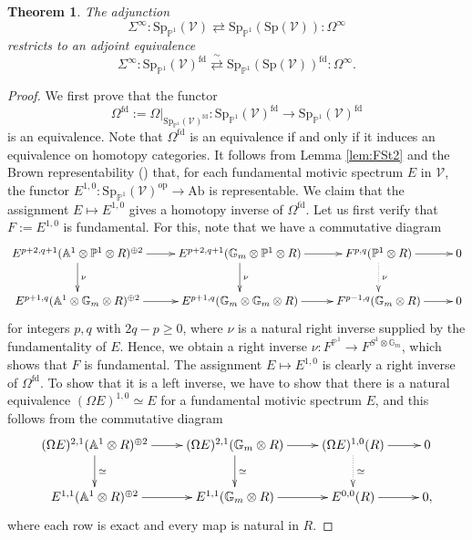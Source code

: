 \documentclass{amsart}
\theoremstyle{plain}
\newtheorem{theorem}{Theorem}[subsection]
\theoremstyle{definition}
\theoremstyle{remark}
\numberwithin{equation}{theorem}
\newcommand{\mbb}[1]{\mathbb{#1}}
\newcommand{\Ab}{\mathrm{Ab}}
\newcommand{\Sp}{\mathrm{Sp}}
\newcommand{\V}{\mathcal{V}}
\newcommand{\fd}{\mathrm{fd}}
\newcommand{\op}{\mathrm{op}}
\newcommand{\SpP}{\mathrm{Sp}_{\mathbb{P}^1}}
\begin{document}
\begin{theorem}\label{thm:FSt}
The adjunction
\[
	\Sigma^\infty \colon \SpP(\V) \rightleftarrows \SpP(\Sp(\V)) \colon \Omega^\infty
\]
restricts to an adjoint equivalence
\[
	\Sigma^\infty \colon \SpP(\V)^\fd \overset{\sim}{\rightleftarrows} \SpP(\Sp(\V))^\fd \colon \Omega^\infty.
\]
\end{theorem}
\begin{proof}
We first prove that the functor
\[
	\Omega^\fd:=\Omega\vert_{\SpP(\V)^\fd} \colon \SpP(\V)^\fd \to \SpP(\V)^\fd
\]
is an equivalence.
Note that $\Omega^\fd$ is an equivalence if and only if it induces an equivalence on homotopy categories.
It follows from Lemma \ref{lem:FSt2} and the Brown representability (\cite[1.4.1.10]{HA}) that, for each fundamental motivic spectrum $E$ in $\V$, the functor $E^{1,0}\colon\SpP(\V)^\op\to\Ab$ is representable.
We claim that the assignment $E\mapsto E^{1,0}$ gives a homotopy inverse of $\Omega^\fd$.
Let us first verify that $F:=E^{1,0}$ is fundamental.
For this, note that we have a commutative diagram
\[
\xymatrix{
	E^{p+2,q+1}(\mbb{A}^1\otimes\mbb{P}^1\otimes R)^{\oplus 2} \ar[r] \ar[d]^\nu &
		E^{p+2,q+1}(\mbb{G}_m\otimes\mbb{P}^1\otimes R) \ar[r] \ar[d]^\nu & F^{p,q}(\mbb{P}^1\otimes R) \ar[r] \ar@{.>}[d]^\nu & 0 \\
	E^{p+1,q}(\mbb{A}^1\otimes\mbb{G}_m\otimes R)^{\oplus 2} \ar[r] &
		E^{p+1,q}(\mbb{G}_m\otimes\mbb{G}_m\otimes R) \ar[r] & F^{p-1,q}(\mbb{G}_m\otimes R) \ar[r] & 0
}
\]
for integers $p,q$ with $2q-p\ge 0$, where $\nu$ is a natural right inverse supplied by the fundamentality of $E$.
Hence, we obtain a right inverse $\nu\colon F^{\mbb{P}^1}\to F^{S^1\otimes\mbb{G}_m}$, which shows that $F$ is fundamental.
The assignment $E\mapsto E^{1,0}$ is clearly a right inverse of $\Omega^\fd$.
To show that it is a left inverse, we have to show that there is a natural equivalence $(\Omega E)^{1,0}\simeq E$ for a fundamental motivic spectrum $E$, and this follows from the commutative diagram
\[
\xymatrix{
	(\Omega E)^{2,1}(\mbb{A}^1\otimes R)^{\oplus 2} \ar[r] \ar[d]^\simeq & 
		(\Omega E)^{2,1}(\mbb{G}_m\otimes R) \ar[r] \ar[d]^\simeq & (\Omega E)^{1,0}(R) \ar[r] \ar@{.>}[d]^\simeq & 0 \\
	E^{1,1}(\mbb{A}^1\otimes R)^{\oplus 2} \ar[r] & 
		E^{1,1}(\mbb{G}_m\otimes R) \ar[r] & E^{0,0}(R) \ar[r] & 0,
}
\]
where each row is exact and every map is natural in $R$.


\end{proof}
\end{document}
